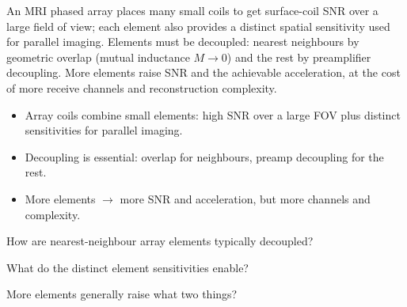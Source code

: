 \begin{workedexample}
An MRI phased array places many small coils to get surface-coil SNR over a
large field of view; each element also provides a distinct spatial sensitivity
used for parallel imaging. Elements must be decoupled: nearest neighbours by
geometric overlap (mutual inductance $M \to 0$) and the rest by preamplifier
decoupling. More elements raise SNR and the achievable acceleration, at the cost
of more receive channels and reconstruction complexity.
\end{workedexample}

\begin{keytakeaways}
\begin{itemize}[leftmargin=1.4em,itemsep=2pt]
\item Array coils combine small elements: high SNR over a large FOV plus distinct sensitivities for parallel imaging.
\item Decoupling is essential: overlap for neighbours, preamp decoupling for the rest.
\item More elements $\to$ more SNR and acceleration, but more channels and complexity.
\end{itemize}
\end{keytakeaways}

\begin{exercises}
\item How are nearest-neighbour array elements typically decoupled?
\item What do the distinct element sensitivities enable?
\item More elements generally raise what two things?
\end{exercises}

